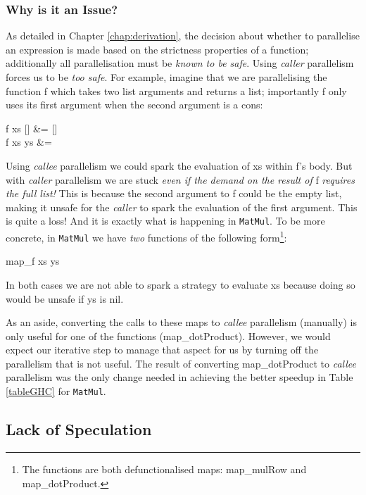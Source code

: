 \subsubsection*{Why is it an Issue?}

As detailed in Chapter \ref{chap:derivation}, the decision about whether to parallelise
an expression is made based on the strictness properties of a function; additionally
all parallelisation must be \emph{known to be safe}. Using \emph{caller} parallelism
forces us to be \emph{too safe}. For example, imagine that we are parallelising
the function \<f\> which takes two list arguments and returns a list; importantly
\<f\> only uses its first argument when the second argument is a \<cons\>:

\begin{haskell}
f xs [] &= [] \\
f xs ys &= 
\end{haskell}

Using \emph{callee} parallelism we could spark the evaluation of \<xs\> within
\<f\>'s body. But with \emph{caller} parallelism we are stuck \emph{even if the
demand on the result of} \<f\> \emph{requires the full list!} This is because
the second argument to \<f\> could be the empty list, making it unsafe for the
\emph{caller} to spark the evaluation of the first argument. This is quite a
loss! And it is exactly what is happening in \verb|MatMul|. To be more concrete, in
\verb|MatMul| we have \emph{two} functions of the following form\footnote{The
functions are both defunctionalised \<map\>s: \<map_{mulRow}\> and
\<map_{dotProduct}\>.}:

\begin{haskell}
map_{f} xs ys 
\end{haskell}

In both cases we are not able to spark a strategy to evaluate \<xs\> because doing
so would be unsafe if \<ys\> is \<nil\>.

As an aside, converting the calls to these \<map\>s to \emph{callee}
parallelism (manually) is only useful for one of the functions
(\<map_{dotProduct}\>). However, we would expect our iterative step to manage
that aspect for us by turning off the parallelism that is not useful. The
result of converting \<map_{dotProduct}\> to \emph{callee} parallelism was the
only change needed in achieving the better speedup in Table \ref{tableGHC} for
\verb|MatMul|.


\subsection{Lack of Speculation}

